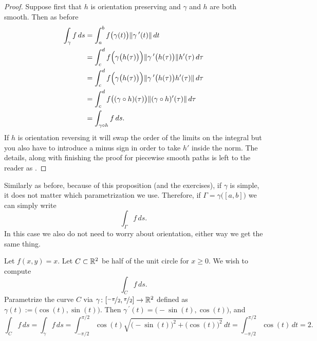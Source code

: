 \begin{proof}
Suppose first that $h$ is orientation preserving and $\gamma$ and $h$
are both smooth.  Then as before
\begin{equation*}
\begin{split}
\int_{\gamma} f \, ds
& =
\int_a^b 
f\bigl(\gamma(t)\bigr) \lVert {\gamma^{\:\prime}(t)} \rVert \, dt
\\
& =
\int_c^d 
f\Bigl(\gamma\bigl(h(\tau)\bigr)\Bigr) \lVert {\gamma^{\:\prime}\bigl(h(\tau)\bigr)} \rVert h'(\tau) \, d\tau
\\
& =
\int_c^d 
f\Bigl(\gamma\bigl(h(\tau)\bigr)\Bigr) \lVert {\gamma^{\:\prime}\bigl(h(\tau)\bigr) h'(\tau)} \rVert \, d\tau
\\
& =
\int_c^d 
f\bigl((\gamma \circ h)(\tau)\bigr) \lVert {(\gamma \circ h)'(\tau)} \rVert \, d\tau
\\
& = 
\int_{\gamma \circ h} f \, ds .
\end{split}
\end{equation*}
If $h$ is orientation reversing it will swap the order of the limits on the
integral but you also have to introduce a minus sign in order
to take $h'$ inside the norm.
The details, along with finishing the proof for piecewise smooth
paths is left to the reader as .
\end{proof}

Similarly as before, because of this proposition (and the exercises),
if $\gamma$ is simple, it does not matter which
parametrization we use.  Therefore, if $\Gamma = \gamma\bigl( [a,b] \bigr)$ we can
simply write
\begin{equation*}
\int_\Gamma f\, ds .
\end{equation*}
In this case we also do not need to worry about orientation, either way we
get the same thing.

\begin{example}
Let $f(x,y) = x$.  Let $C \subset {\mathbb{R}}^2$ be half of the unit circle for $x
\geq 0$.  We wish to compute
\begin{equation*}
\int_C f \, ds .
\end{equation*}
Parametrize the curve $C$ via $\gamma \colon
[\nicefrac{-\pi}{2},\nicefrac{\pi}{2}] \to {\mathbb{R}}^2$ defined as
$\gamma(t) := \bigl(\cos(t),\sin(t)\bigr)$.
Then $\gamma^{\:\prime}(t) = \bigl(-\sin(t),\cos(t)\bigr)$, and
\begin{equation*}
\int_C f \, ds =
\int_\gamma f \, ds
=
\int_{-\pi/2}^{\pi/2} \cos(t) \sqrt{ {\bigl(-\sin(t)\bigr)}^2 +  
{\bigl(\cos(t)\bigr)}^2 } \, dt
=
\int_{-\pi/2}^{\pi/2} \cos(t) \, dt = 2.
\end{equation*}
\end{example}

